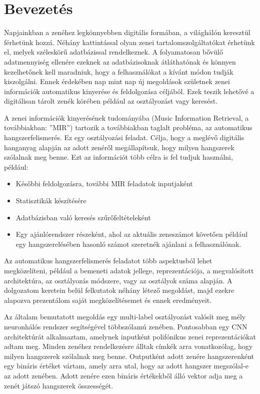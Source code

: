\chapter{Bevezetés} %
\label{ch:intro}

Napjainkban a zenéhez legkönnyebben digitális formában, a világhálón keresztül férhetünk hozzá. Néhány kattintással olyan zenei tartalomszolgáltatókat érhetünk el, melyek széleskörű adatbázissal rendelkeznek. A folyamatosan bővülő adatmennyiség ellenére ezeknek az adatbázisoknak átláthatónak és könnyen kezelhetőnek kell maradniuk, hogy a felhasználókat a kívánt módon tudják kiszolgálni. Ennek érdekében nap mint nap új  megoldások születnek zenei információk automatikus kinyerése és feldolgozása céljából. Ezek teszik lehetővé a digitálisan tárolt zenék körében például az osztályozást vagy keresést.

A zenei információk kinyerésének tudományába (Music Information Retrieval, a továbbiakban: ''MIR'') tartozik a továbbiakban taglalt probléma, az automatikus hangszerfelismerés. Ez egy osztályozási feladat. Célja, hogy a meglévő digitális hanganyag alapján az adott zenéről megállapítsuk, hogy milyen hangszerek szólalnak meg benne. Ezt az információt több célra is fel tudjuk használni, például:
\begin{itemize}
 \item Későbbi feldolgozásra, további MIR feladatok inputjaként
 \item Statisztikák készítésére
 \item Adatbázisban való keresés szűrőfeltételeként
 \item Egy ajánlórendszer részeként, ahol az aktuális zeneszámot követően például egy hangszerelésében hasonló számot szeretnék ajánlani a felhasználónak.
\end{itemize}

Az automatikus hangszerfelismerés feladatot több aspektusból lehet megközelíteni, például a bemeneti adatok jellege, reprezentációja, a megvalósított architektúra, az osztályozás módszere, vagy az osztályok száma alapján. A dolgozatom keretein belül felkutatok néhány létező megoldást, majd ezekre alapozva prezentálom saját megközelítésemet és ennek eredményeit.

Az általam bemutatott megoldás egy multi-label osztályozást valósít meg mély neuronhálós rendszer segítségével többszólamú zenében. Pontosabban egy CNN architektúrát alkalmaztam, amelynek inputként polifónikus zenei reprezentációkat adtam meg. Minden zenéhez rendelkezésre álltak címkék arra vonatkozólag, hogy milyen hangszerek szólalnak meg benne. Outputként adott zenére hangszerenként egy bináris értéket vártam, amely arra utal, hogy az adott hangszer megszólal-e az adott zenében. Adott zenére ezen bináris értékekből álló vektor adja meg a zenét játszó hangszerek összességét.

